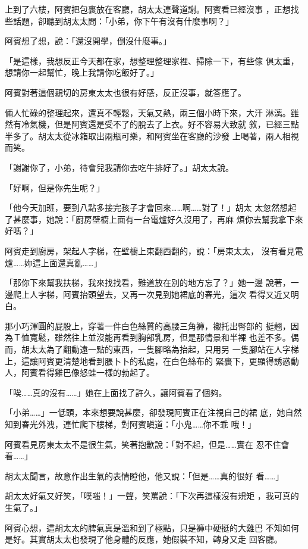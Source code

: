 上到了六樓，阿賓把包裹放在客廳，胡太太連聲道謝。阿賓看已經沒事
，正想找些話題，卻聽到胡太太問：「小弟，你下午有沒有什麼事啊？」

阿賓想了想，說：「還沒開學，倒沒什麼事。」

「是這樣，我想反正今天都在家，想整理整理家裡、掃除一下，有些傢
俱太重，想請你一起幫忙，晚上我請你吃飯好了。」

阿賓對著這個親切的房東太太也很有好感，反正沒事，就答應了。

倆人忙碌的整理起來，還真不輕鬆，天氣又熱，兩三個小時下來，大汗
淋漓。雖然有冷氣機，但是阿賓還是受不了的脫去了上衣。好不容易大致就
敘，已經三點半多了。胡太太從冰箱取出兩瓶可樂，和阿賓坐在客廳的沙發
上喝著，兩人相視而笑。

「謝謝你了，小弟，待會兒我請你去吃牛排好了。」胡太太說。

「好啊，但是你先生呢？」

「他今天加班，要到八點多接完孩子才會回來……啊……對了！」胡太
太忽然想起了甚麼事，她說：「廚房壁櫥上面有一台電爐好久沒用了，再麻
煩你去幫我拿下來好嗎？」

阿賓走到廚房，架起人字梯，在壁櫥上東翻西翻的，說：「房東太太，
沒有看見電爐……妳這上面還真亂……」

「那你下來幫我扶梯，我來找找看，難道放在別的地方忘了？」她一邊
說著，一邊爬上人字梯，阿賓抬頭望去，又再一次見到她裙底的春光，這次
看得又近又明白。

那小巧渾圓的屁股上，穿著一件白色絲質的高腰三角褲，襯托出臀部的
挺翹，因為Ｔ恤寬鬆，雖然往上並沒能再看到胸部乳房，但是那情景和半裸
也差不多。偶而，胡太太為了翻動遠一點的東西，一隻腳略為抬起，只用另
一隻腳站在人字梯上，這讓阿賓更清楚地看到脹卜卜的私處，在白色絲布的
緊裹下，更顯得誘惑動人，阿賓看得雞巴像怒蛙一樣的勃起了。

「唉……真的沒有……」她在上面找了許久，讓阿賓看了個夠。

「小弟……」一低頭，本來想要說甚麼，卻發現阿賓正在注視自己的裙
底，她自然知到春光外洩，連忙爬下樓梯，對阿賓瞋道：「小鬼……你不乖
哦！」

阿賓看見房東太太不是很生氣，笑著抱歉說：「對不起，但是……實在
忍不住會看……」

胡太太聞言，故意作出生氣的表情瞪他，他又說：「但是……真的很好
看……」

胡太太好氣又好笑，「噗嗤！」一聲，笑罵說：「下次再這樣沒有規矩
，我可真的生氣了。」

阿賓心想，這胡太太的脾氣真是溫和到了極點，只是褲中硬挺的大雞巴
不知如何是好。其實胡太太也發現了他身體的反應，她假裝不知，轉身又走
回客廳。

